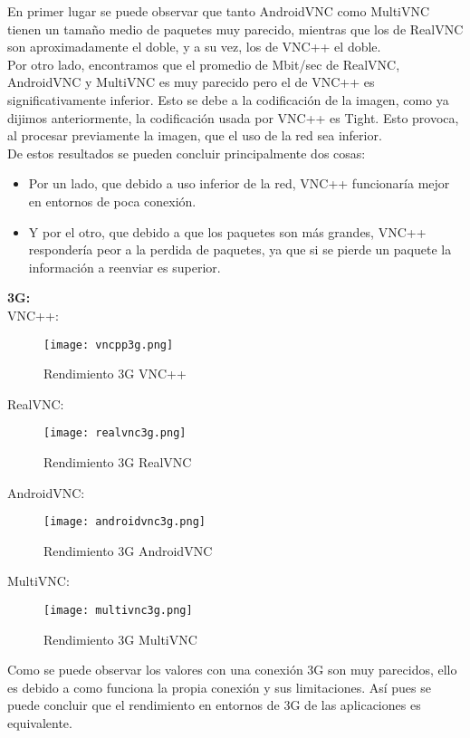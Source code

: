 En primer lugar se puede observar que tanto AndroidVNC como MultiVNC tienen un tamaño medio de paquetes muy parecido, mientras que los de RealVNC son aproximadamente el doble, y a su vez, los de VNC++ el doble.\\

Por otro lado, encontramos que el promedio de Mbit/sec de RealVNC, AndroidVNC y MultiVNC es muy parecido pero el de VNC++ es significativamente inferior. Esto se debe a la codificación de la imagen, como ya dijimos anteriormente, la codificación usada por VNC++ es Tight. Esto provoca, al procesar previamente la imagen, que el uso de la red sea inferior.\\

De estos resultados se pueden concluir principalmente dos cosas:
\begin{itemize}
\item Por un lado, que debido a uso inferior de la red, VNC++ funcionaría mejor en entornos de poca conexión.
\item Y por el otro, que debido a que los paquetes son más grandes, VNC++ respondería peor a la perdida de paquetes, ya que si se pierde un paquete la información a reenviar es superior.
\end{itemize}
\newpage
\textbf{3G:}\\

VNC++:
\begin{figure}[h]
\begin{flushleft}
\texttt{[image: vncpp3g.png]}
\end{flushleft}
\caption{Rendimiento 3G VNC++}
\end{figure}

RealVNC:
\begin{figure}[h]
\begin{flushleft}
\texttt{[image: realvnc3g.png]}
\end{flushleft}
\caption{Rendimiento 3G RealVNC}
\end{figure}

AndroidVNC:
\begin{figure}[h]
\begin{flushleft}
\texttt{[image: androidvnc3g.png]}
\end{flushleft}
\caption{Rendimiento 3G AndroidVNC}
\end{figure}
\newpage
MultiVNC:
\begin{figure}[h]
\begin{flushleft}
\texttt{[image: multivnc3g.png]}
\end{flushleft}
\caption{Rendimiento 3G MultiVNC}
\end{figure}

Como se puede observar los valores con una conexión 3G son muy parecidos, ello es debido a como funciona la propia conexión y sus limitaciones. Así pues se puede concluir que el rendimiento en entornos de 3G de las aplicaciones es equivalente.
